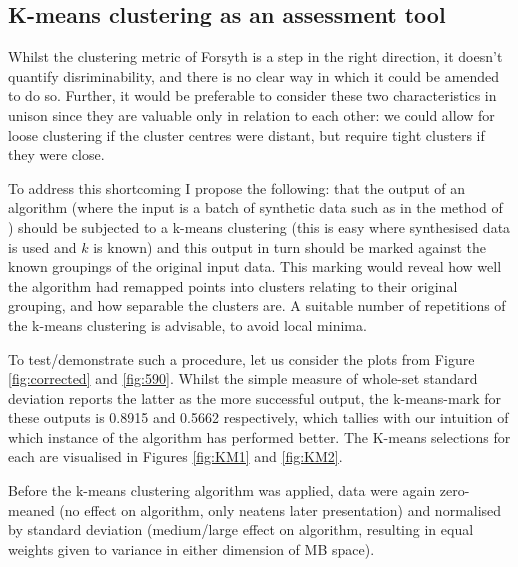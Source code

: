 \subsection{K-means clustering as an assessment tool}

Whilst the clustering metric of Forsyth is a step in the right direction, it doesn't quantify disriminability, and there is no clear way in which it could be amended to do so. Further, it would be preferable to consider these two characteristics in unison since they are valuable only in relation to each other: we could allow for loose clustering if the cluster centres were distant, but require tight clusters if they were close. 

To address this shortcoming I propose the following: that the output of an algorithm (where the input is a batch of synthetic data such as in the method of \citet{barnard_comparison_2002}) should be subjected to a k-means clustering (this is easy where synthesised data is used and $k$ is known) and this output in turn should be marked against the known groupings of the original input data. This marking would reveal how well the algorithm had remapped points into clusters relating to their original grouping, and how separable the clusters are. A suitable number of repetitions of the k-means clustering is advisable, to avoid local minima. 


To test/demonstrate such a procedure, let us consider the plots from Figure \ref{fig:corrected} and \ref{fig:590}. Whilst the simple measure of whole-set standard deviation reports the latter as the more successful output, the k-means-mark for these outputs is 0.8915 and 0.5662 respectively, which tallies with our intuition of which instance of the algorithm has performed better. The K-means selections for each are visualised in Figures \ref{fig:KM1} and \ref{fig:KM2}.

Before the k-means clustering algorithm was applied, data were again zero-meaned (no effect on algorithm, only neatens later presentation) and normalised by standard deviation (medium/large effect on algorithm, resulting in equal weights given to variance in either dimension of \gls{MB} space).

